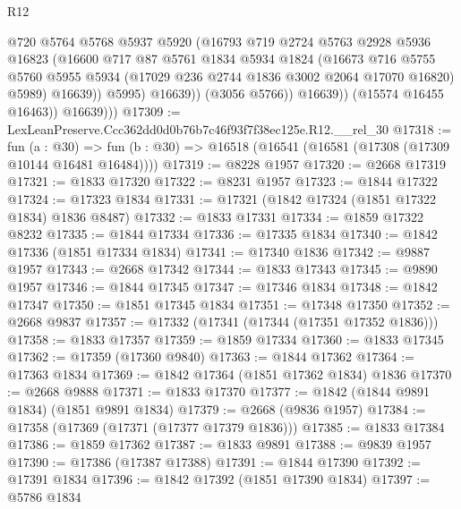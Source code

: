 \begin{lexlean}{R12}
\begin{coremodule}
                        @720
                        @5764
                        @5768
                        @5937
                        @5920
                        (@16793
                          @719
                          @2724
                          @5763
                          @2928
                          @5936
                          @16823
                          (@16600
                            @717
                            @87
                            @5761
                            @1834
                            @5934
                            @1824
                            (@16673
                              @716
                              @5755
                              @5760
                              @5955
                              @5934
                              (@17029 @236 @2744 @1836 @3002 @2064 @17070 @16820)
                              @5989)
                            @16639))
                        @5995)
                      @16639))
                  (@3056 @5766))
                @16639))
            (@15574 @16455 @16463))
          @16639)))
@17309 := LexLeanPreserve.Ccc362dd0d0b76b7c46f93f7f38ec125e.R12.__rel_30
@17318 := fun (a : @30) =>
  fun (b : @30) => @16518 (@16541 (@16581 (@17308 (@17309 @10144 @16481 @16484))))
@17319 := @8228 @1957
@17320 := @2668 @17319
@17321 := @1833 @17320
@17322 := @8231 @1957
@17323 := @1844 @17322
@17324 := @17323 @1834
@17331 := @17321 (@1842 @17324 (@1851 @17322 @1834) @1836 @8487)
@17332 := @1833 @17331
@17334 := @1859 @17322 @8232
@17335 := @1844 @17334
@17336 := @17335 @1834
@17340 := @1842 @17336 (@1851 @17334 @1834)
@17341 := @17340 @1836
@17342 := @9887 @1957
@17343 := @2668 @17342
@17344 := @1833 @17343
@17345 := @9890 @1957
@17346 := @1844 @17345
@17347 := @17346 @1834
@17348 := @1842 @17347
@17350 := @1851 @17345 @1834
@17351 := @17348 @17350
@17352 := @2668 @9837
@17357 := @17332 (@17341 (@17344 (@17351 @17352 @1836)))
@17358 := @1833 @17357
@17359 := @1859 @17334
@17360 := @1833 @17345
@17362 := @17359 (@17360 @9840)
@17363 := @1844 @17362
@17364 := @17363 @1834
@17369 := @1842 @17364 (@1851 @17362 @1834) @1836
@17370 := @2668 @9888
@17371 := @1833 @17370
@17377 := @1842 (@1844 @9891 @1834) (@1851 @9891 @1834)
@17379 := @2668 (@9836 @1957)
@17384 := @17358 (@17369 (@17371 (@17377 @17379 @1836)))
@17385 := @1833 @17384
@17386 := @1859 @17362
@17387 := @1833 @9891
@17388 := @9839 @1957
@17390 := @17386 (@17387 @17388)
@17391 := @1844 @17390
@17392 := @17391 @1834
@17396 := @1842 @17392 (@1851 @17390 @1834)
@17397 := @5786 @1834

\end{coremodule}
\end{lexlean}
